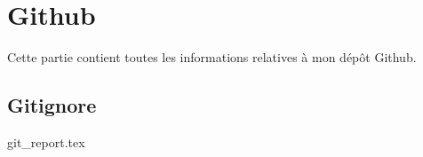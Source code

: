 \section{Github}
Cette partie contient toutes les informations relatives à mon dépôt Github. 

\subsection*{Gitignore}



{git_report.tex}